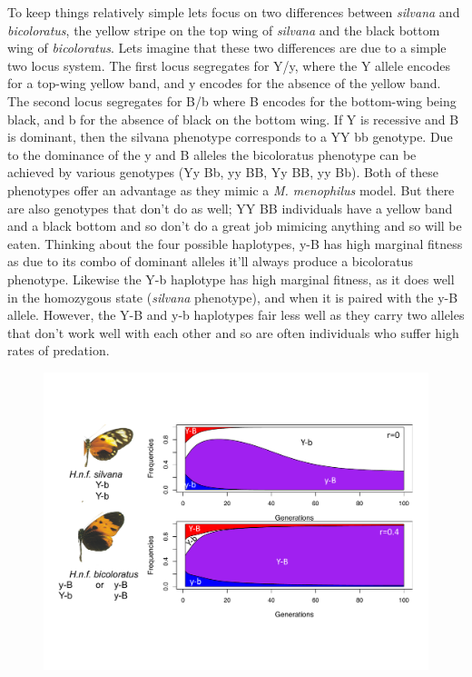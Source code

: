 To keep things relatively simple lets focus on two differences between  {\it silvana} and {\it  bicoloratus}, the yellow stripe on the top wing of {\it silvana} and the black bottom wing of  {\it  bicoloratus}. Lets imagine that these two differences are due to a simple two locus system. The first locus segregates for Y/y, where the Y allele encodes for a top-wing yellow band, and y encodes for the absence of the yellow band. The second locus segregates for B/b where B encodes for the bottom-wing being black, and b for the absence of black on the bottom wing. If Y is recessive and B is dominant, then the silvana phenotype corresponds to a YY bb genotype. Due to the dominance of the y and B alleles the bicoloratus phenotype can be achieved by various genotypes (Yy Bb, yy BB, Yy BB, yy Bb).  Both of these phenotypes offer an advantage as they mimic a {\it M. menophilus} model. But there are also genotypes that don't do as well; YY BB individuals have a yellow band and a black bottom and so don't do a great job mimicing anything and so will be eaten. Thinking about the  four possible haplotypes, y-B has high marginal fitness as due to its combo of dominant alleles it'll always produce a bicoloratus phenotype. Likewise the Y-b haplotype has high marginal fitness, as it does well in the homozygous state ({\it silvana} phenotype), and when it is paired with the y-B allele. However, the Y-B and y-b haplotypes fair less well as they carry two alleles that don't work well with each other and so are often individuals who suffer high rates of predation. 

\begin{figure} %
\begin{center}
 \includegraphics[width = \textwidth]{figures/selection_recom_interaction/H_numata_two_loc_freqs.pdf}
\end{center}
\caption{ } \label{fig:numata_two_loc_freqs}  %
\end{figure}

